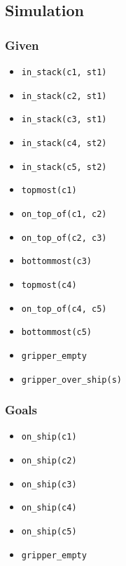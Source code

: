 \documentclass[12pt]{article}
\begin{document}
\subsection{Simulation}
\subsubsection{Given}
\begin{itemize}
  \item \texttt{in\_stack(c1, st1)}
  \item \texttt{in\_stack(c2, st1)}
  \item \texttt{in\_stack(c3, st1)}
  \item \texttt{in\_stack(c4, st2)}
  \item \texttt{in\_stack(c5, st2)}
  \item \texttt{topmost(c1)}
  \item \texttt{on\_top\_of(c1, c2)}
  \item \texttt{on\_top\_of(c2, c3)}
  \item \texttt{bottommost(c3)}
  \item \texttt{topmost(c4)}
  \item \texttt{on\_top\_of(c4, c5)}
  \item \texttt{bottommost(c5)}
  \item \texttt{gripper\_empty}
  \item \texttt{gripper\_over\_ship(s)}
\end{itemize}

\subsubsection{Goals}
\begin{itemize}
  \item \texttt{on\_ship(c1)}
  \item \texttt{on\_ship(c2)}
  \item \texttt{on\_ship(c3)}
  \item \texttt{on\_ship(c4)}
  \item \texttt{on\_ship(c5)}
  \item \texttt{gripper\_empty}
\end{itemize}
\end{document}
